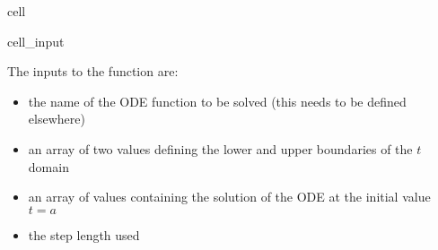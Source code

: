 \documentclass[letterpaper,10pt,english]{jupyterBook}
\begin{document}
\begin{sphinxuseclass}{cell}\begin{sphinxVerbatimInput}

\begin{sphinxuseclass}{cell_input}
\begin{sphinxVerbatim}[commandchars=\\\{\}]
    
      \PYG{p}{[}\PYG{p}{]}  \PYG{p}{[}\PYG{p}{]}  
      
          
         
    \PYG{p}{[}\PYG{p}{]}  
       
        \PYG{p}{[}\PYG{p}{]}  \PYG{p}{[}\PYG{p}{]}    \PYG{p}{[}\PYG{p}{]} \PYG{p}{[}\PYG{p}{]}
        
       
\end{sphinxVerbatim}

\end{sphinxuseclass}\end{sphinxVerbatimInput}

\end{sphinxuseclass}
\sphinxAtStartPar
The inputs to the function  are:
\begin{itemize}
\item {} 
\sphinxAtStartPar
{} \sphinxhyphen{} the name of the ODE function to be solved (this needs to be defined elsewhere)

\item {} 
\sphinxAtStartPar
{} \sphinxhyphen{} an array of two values defining the lower and upper boundaries of the \(t\) domain

\item {} 
\sphinxAtStartPar
{} \sphinxhyphen{} an array of values containing the solution of the ODE at the initial value \(t=a\)

\item {} 
\sphinxAtStartPar
{} \sphinxhyphen{} the step length used

\end{itemize}
\end{document}
